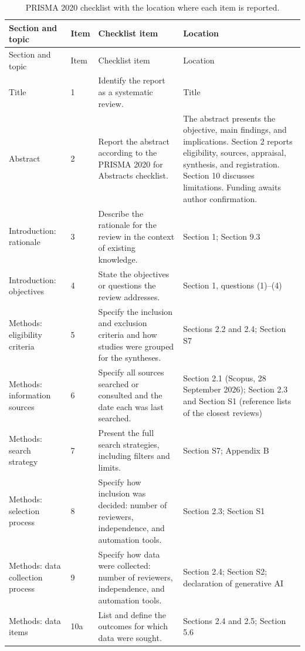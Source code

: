 \documentclass[a4paper,11pt]{article}
\begin{document}
\begin{footnotesize}
\setlength{\tabcolsep}{3pt}
\begin{longtable}{@{}L{3.0cm}L{0.8cm}L{6.4cm}L{\dimexpr\linewidth-10.2cm-6\tabcolsep\relax}@{}}
\caption{PRISMA 2020 checklist with the location where each item is reported.}\label{tab:prisma}\\
\toprule
Section and topic & Item & Checklist item & Location\\
\midrule
\endfirsthead
\toprule
Section and topic & Item & Checklist item & Location\\
\midrule
\endhead
\bottomrule
\endfoot
Title & 1 & Identify the report as a systematic review. & Title\\
Abstract & 2 & Report the abstract according to the PRISMA 2020 for Abstracts checklist. & The abstract presents the objective, main findings, and implications. Section 2 reports eligibility, sources, appraisal, synthesis, and registration. Section 10 discusses limitations. Funding awaits author confirmation.\\
Introduction: rationale & 3 & Describe the rationale for the review in the context of existing knowledge. & Section 1; Section 9.3\\
Introduction: objectives & 4 & State the objectives or questions the review addresses. & Section 1, questions (1)--(4)\\
Methods: eligibility criteria & 5 & Specify the inclusion and exclusion criteria and how studies were grouped for the syntheses. & Sections 2.2 and 2.4; Section S7\\
Methods: information sources & 6 & Specify all sources searched or consulted and the date each was last searched. & Section 2.1 (Scopus, 28 September 2026); Section 2.3 and Section S1 (reference lists of the closest reviews)\\
Methods: search strategy & 7 & Present the full search strategies, including filters and limits. & Section S7; Appendix B\\
Methods: selection process & 8 & Specify how inclusion was decided: number of reviewers, independence, and automation tools. & Section 2.3; Section S1\\
Methods: data collection process & 9 & Specify how data were collected: number of reviewers, independence, and automation tools. & Section 2.4; Section S2; declaration of generative AI\\
Methods: data items & 10a & List and define the outcomes for which data were sought. & Sections 2.4 and 2.5; Section 5.6\\

\end{longtable}
\end{footnotesize}
\end{document}
